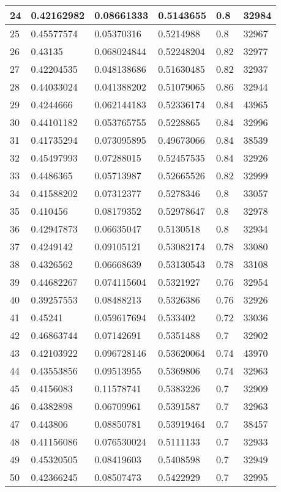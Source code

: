 \begin{longtable}{|l|l|l|l|l|l|}
24 & 0.42162982 & 0.08661333 & 0.5143655 & 0.8 & 32984 \\ \hline 
25 & 0.45577574 & 0.05370316 & 0.5214988 & 0.8 & 32967 \\ \hline 
26 & 0.43135 & 0.068024844 & 0.52248204 & 0.82 & 32977 \\ \hline 
27 & 0.42204535 & 0.048138686 & 0.51630485 & 0.82 & 32937 \\ \hline 
28 & 0.44033024 & 0.041388202 & 0.51079065 & 0.86 & 32944 \\ \hline 
29 & 0.4244666 & 0.062144183 & 0.52336174 & 0.84 & 43965 \\ \hline 
30 & 0.44101182 & 0.053765755 & 0.5228865 & 0.84 & 32996 \\ \hline 
31 & 0.41735294 & 0.073095895 & 0.49673066 & 0.84 & 38539 \\ \hline 
32 & 0.45497993 & 0.07288015 & 0.52457535 & 0.84 & 32926 \\ \hline 
33 & 0.4486365 & 0.05713987 & 0.52665526 & 0.82 & 32999 \\ \hline 
34 & 0.41588202 & 0.07312377 & 0.5278346 & 0.8 & 33057 \\ \hline 
35 & 0.410456 & 0.08179352 & 0.52978647 & 0.8 & 32978 \\ \hline 
36 & 0.42947873 & 0.06635047 & 0.5130518 & 0.8 & 32934 \\ \hline 
37 & 0.4249142 & 0.09105121 & 0.53082174 & 0.78 & 33080 \\ \hline 
38 & 0.4326562 & 0.06668639 & 0.53130543 & 0.78 & 33108 \\ \hline 
39 & 0.44682267 & 0.074115604 & 0.5321927 & 0.76 & 32954 \\ \hline 
40 & 0.39257553 & 0.08488213 & 0.5326386 & 0.76 & 32926 \\ \hline 
41 & 0.45241 & 0.059617694 & 0.533402 & 0.72 & 33036 \\ \hline 
42 & 0.46863744 & 0.07142691 & 0.5351488 & 0.7 & 32902 \\ \hline 
43 & 0.42103922 & 0.096728146 & 0.53620064 & 0.74 & 43970 \\ \hline 
44 & 0.43553856 & 0.09513955 & 0.5369806 & 0.74 & 32963 \\ \hline 
45 & 0.4156083 & 0.11578741 & 0.5383226 & 0.7 & 32909 \\ \hline 
46 & 0.4382898 & 0.06709961 & 0.5391587 & 0.7 & 32963 \\ \hline 
47 & 0.443806 & 0.08850781 & 0.53919464 & 0.7 & 38457 \\ \hline 
48 & 0.41156086 & 0.076530024 & 0.5111133 & 0.7 & 32933 \\ \hline 
49 & 0.45320505 & 0.08419603 & 0.5408598 & 0.7 & 32949 \\ \hline 
50 & 0.42366245 & 0.08507473 & 0.5422929 & 0.7 & 32995 \\ \hline 
\end{longtable}